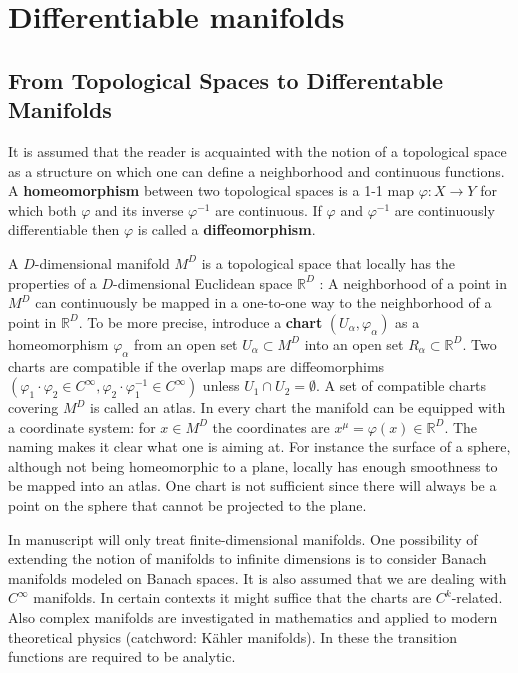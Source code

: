 \section{Differentiable manifolds}
\subsection{From Topological Spaces to Differentable Manifolds}
It is assumed that the reader is acquainted with the notion of a topological space as a structure on which one can define a neighborhood and continuous functions. A \textbf{homeomorphism} between two topological spaces is a 1-1 map $\varphi: X\to Y$ for which both $\varphi$ and its inverse $\varphi^{-1}$ are continuous. If $\varphi$ and $\varphi^{-1}$ are continuously differentiable then $\varphi$ is called a \textbf{diffeomorphism}.

A $D$-dimensional manifold $M^D$ is a topological space that locally has the properties of a $D$-dimensional Euclidean space $\mathbb{R}^D$ : A neighborhood of a point in $M^D$
can continuously be mapped in a one-to-one way to the neighborhood of a point in
$\mathbb{R}^D$. To be more precise, introduce a \textbf{chart} $(U_\alpha,\varphi_\alpha)$ as a homeomorphism $\varphi_\alpha$ from
an open set $U_\alpha\subset M^D$ into an open set $R_\alpha\subset \mathbb{R}^D$. Two charts are compatible if the overlap maps are diffeomorphims $(\varphi_1\cdot \varphi_2\in C^\infty,\varphi_2\cdot \varphi_1^{-1}\in C^\infty)$ unless $U_1\cap U_2=\emptyset$. A set of compatible charts covering $M^D$ is called an atlas. In every chart the manifold can be equipped with a coordinate system: for $x\in M^D$ the coordinates are $x^\mu=\varphi(x)\in \mathbb{R}^D$. The naming makes it clear what one is aiming at. For instance the surface of a sphere, although not being homeomorphic to a plane, locally has enough smoothness to be mapped into an atlas. One chart is not sufficient since there will always be a point on the sphere that cannot be projected to the plane.

In manuscript will only treat finite-dimensional manifolds. One possibility of extending the notion of manifolds to infinite dimensions is to consider Banach manifolds modeled on Banach spaces. It is also assumed that we are dealing with $C^\infty$ manifolds. In certain contexts it might suffice that the charts are $C^k$-related. Also complex manifolds are investigated in mathematics and applied to modern theoretical physics (catchword: Kähler manifolds). In these the transition functions are required to be analytic.


